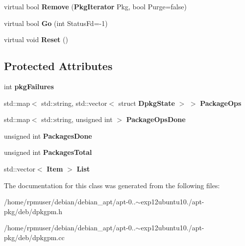\begin{DoxyCompactItemize}
\item 
virtual bool {\bfseries \-Remove} ({\bf \-Pkg\-Iterator} \-Pkg, bool \-Purge=false)\label{classpkgDPkgPM_a0fc997d1b3b078d21271df1c16813479}

\item 
virtual bool {\bfseries \-Go} (int \-Status\-Fd=-\/1)\label{classpkgDPkgPM_aab500dc5936894f0c526222ad491a0f6}

\item 
virtual void {\bfseries \-Reset} ()\label{classpkgDPkgPM_a372de693ad40b3f42839c8ec6ac845f4}

\end{DoxyCompactItemize}
\subsection*{\-Protected \-Attributes}
\begin{DoxyCompactItemize}
\item 
int {\bfseries pkg\-Failures}\label{classpkgDPkgPM_a70d3397a28f7837466efc1caa9cc27b7}

\item 
std\-::map$<$ std\-::string, \*
std\-::vector$<$ struct {\bf \-Dpkg\-State} $>$ $>$ {\bfseries \-Package\-Ops}\label{classpkgDPkgPM_ab75bd21bb6014527bebc76fb12a7a2bb}

\item 
std\-::map$<$ std\-::string, \*
unsigned int $>$ {\bfseries \-Package\-Ops\-Done}\label{classpkgDPkgPM_a2dd96d391e75d5246f339975c3ea8c4f}

\item 
unsigned int {\bfseries \-Packages\-Done}\label{classpkgDPkgPM_a14269522f51e4bfd222ea4aa06df49df}

\item 
unsigned int {\bfseries \-Packages\-Total}\label{classpkgDPkgPM_abfc859389195c81801fa7fcae30ddb5f}

\item 
std\-::vector$<$ {\bf \-Item} $>$ {\bfseries \-List}\label{classpkgDPkgPM_a0e2503fb8602a7183931947a2981a333}

\end{DoxyCompactItemize}


\-The documentation for this class was generated from the following files\-:\begin{DoxyCompactItemize}
\item 
/home/rpmuser/debian/debian\-\_\-apt/apt-\/0..$\sim$exp12ubuntu10./apt-\/pkg/deb/dpkgpm.\-h\item 
/home/rpmuser/debian/debian\-\_\-apt/apt-\/0..$\sim$exp12ubuntu10./apt-\/pkg/deb/dpkgpm.\-cc\end{DoxyCompactItemize}
